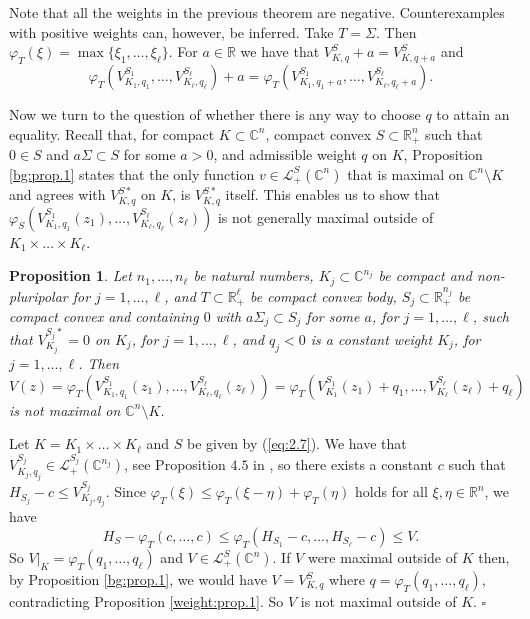 \documentclass[a4paper,12pt,leqno,english]{article}
\numberwithin{equation}{section}
\newtheorem{proposition+}  [theorem+]  {Proposition}
\newenvironment{proposition}{\begin{proposition+}\sl}{\end{proposition+}\rm}
\newenvironment{proof}{\medbreak\noindent{\bf  Proof:}\rm}{\hfill$\square$\rm}
\begin{document}
Note that all the weights in the previous theorem are negative.
Counterexamples with positive weights can, however, be inferred.
Take $T = \Sigma$.
Then $\varphi_T(\xi) = \max\{\xi_1, \dots, \xi_\ell\}$.
For $a \in \mathbb{R}$ we have that $V^S_{K, q} + a = V^S_{K, q + a}$ and
\begin{equation*}
    \varphi_T(V^{S_1}_{K_1, q_1}, \dots, V^{S_\ell}_{K_\ell, q_\ell}) + a
    =
    \varphi_T(V^{S_1}_{K_1, q_1 + a}, \dots, V^{S_\ell}_{K_\ell, q_\ell + a}).
\end{equation*}

Now we turn to the question of whether there is any way to choose $q$ to attain an equality.
Recall that,
    for compact $K \subset \mathbb{C}^n$,
    compact convex $S \subset \mathbb{R}_+^n$ such that $0 \in S$ and $a \Sigma \subset S$ for some $a > 0$, and
    admissible weight $q$ on $K$,
    Proposition \ref{bg:prop.1} states that the only function $v \in \mathcal{L}^S_+(\mathbb{C}^n)$
        that is maximal on $\mathbb{C}^n \setminus K$ and agrees
    with $V^{S*}_{K, q}$ on $K$, is $V^{S*}_{K, q}$ itself.
This enables us to show that $\varphi_S(V^{S_1}_{K_1, q_1}(z_1), \dots, V^{S_\ell}_{K_\ell, q_\ell}(z_\ell))$ is not generally maximal outside of
    $K_1 \times \dots \times K_\ell$.
\begin{proposition}
\label{weight:prop.2}
Let
    $n_1, \dots, n_\ell$ be natural numbers,
    $K_j \subset \mathbb{C}^{n_j}$ be compact and non-pluripolar for $j = 1, \dots, \ell$, and
    $T \subset \mathbb{R}_+^\ell$ be compact convex body,
    $S_j \subset \mathbb{R}_+^{n_j}$ be compact convex and containing $0$ with $a \Sigma_j \subset S_j$ for some $a$, for $j = 1, \dots, \ell$,
        such that $V^{S_j*}_{K_j} = 0$ on $K_j$, for $j = 1, \dots, \ell$, and
    $q_j < 0$ is a constant weight $K_j$, for $j = 1, \dots, \ell$.
Then
\begin{equation*}
    V(z)
    =
    \varphi_T(V^{S_1}_{K_1, q_1}(z_1), \dots, V^{S_\ell}_{K_\ell, q_\ell}(z_\ell))
    =
    \varphi_T(V^{S_1}_{K_1}(z_1) + q_1, \dots, V^{S_\ell}_{K_\ell}(z_\ell) + q_\ell)
\end{equation*}
    is not maximal on $\mathbb{C}^n \setminus K$.
\end{proposition}
\begin{proof}
Let $K = K_1 \times \dots \times K_\ell$ and $S$ be given by (\ref{eq:2.7}).
We have that $V^{S_j}_{K_j, q_j} \in \mathcal{L}^{S_j}_+(\mathbb{C}^{n_j})$, see Proposition $4.5$ in \cite{MagSigSigSno:2023},
    so there exists a constant $c$ such that $H_{S_j} - c \leq V^{S_j}_{K_j, q_j}$.
Since $\varphi_T(\xi) \leq \varphi_T(\xi - \eta) + \varphi_T(\eta)$ holds for all $\xi, \eta \in \mathbb{R}^n$, we have
\begin{equation*}
    H_S - \varphi_T(c, \dots, c)
    \leq
    \varphi_T(H_{S_1} - c, \dots, H_{S_\ell} - c)
    \leq
    V.
\end{equation*}
So $V|_K = \varphi_T(q_1, \dots, q_\ell)$ and $V \in \mathcal{L}_+^S(\mathbb{C}^n)$.
If $V$ were maximal outside of $K$ then, by Proposition \ref{bg:prop.1}, we would have $V = V^S_{K, q}$ where $q = \varphi_T(q_1, \dots, q_\ell)$,
    contradicting Proposition \ref{weight:prop.1}.
So $V$ is not maximal outside of $K$.
\end{proof}
\end{document}
